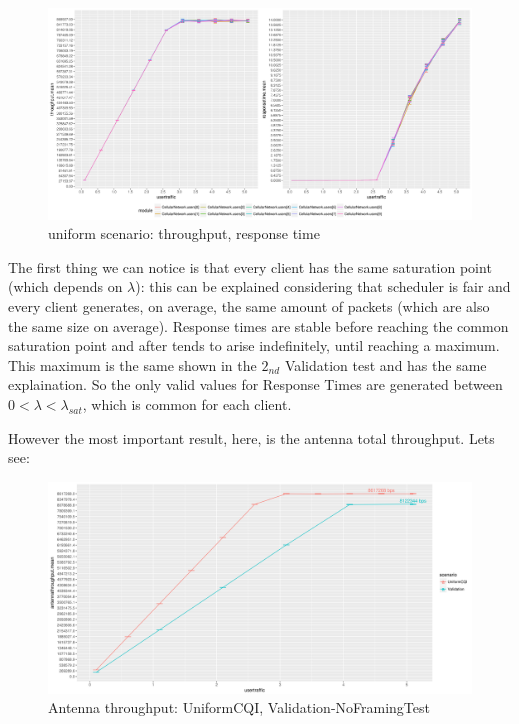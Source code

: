 \begin{figure}[H]
  \includegraphics[width=1\textwidth]{images/unif}
  \caption{uniform scenario: throughput, response time}
  \label{fig:uniform scenario: throughput, response time}
\end{figure}
The first thing we can notice is that every client has the same saturation point (which depends on \(\lambda\)): this can be explained considering that scheduler is fair and every client generates, on average, the same amount of packets (which are also the same size on average). Response times are stable before reaching the common saturation point and after tends to arise indefinitely, until reaching a maximum. This maximum is the same shown in the \(2_{nd}\) Validation test and has the same explaination. So the only valid values for Response Times are generated between \(0 < \lambda < \lambda_{sat}\), which is common for each client.

However the most important result, here, is the antenna total throughput. Lets see:
\begin{figure}[H]
  \includegraphics[width=1\textwidth]{images/thantenna1}
  \caption{Antenna throughput: UniformCQI, Validation-NoFramingTest}
  \label{fig:Antenna throughput: UniformCQI, Validation-NoFramingTest}
\end{figure}

